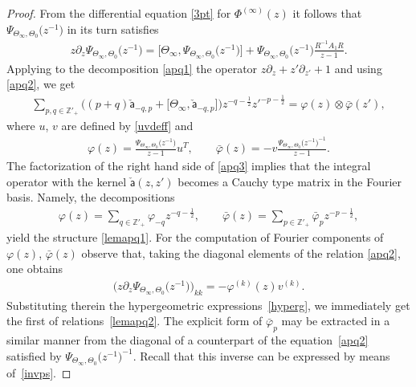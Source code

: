 \documentclass[pdftex]{sigma}
\numberwithin{equation}{section}
\begin{document}
\begin{proof}
From the differential equation \eqref{3pt} for $\Phi^{(\infty)}(z)$ it follows that $\Psi_{\Theta_{\infty},\Theta_{0}}\big(z^{-1}\big)$ in its turn satisfies
\begin{gather}\label{apq2}
z\partial_z \Psi_{\Theta_{\infty},\Theta_{0}}\big(z^{-1}\big)=\big[\Theta_{\infty},\Psi_{\Theta_{\infty},\Theta_{0}}\big(z^{-1}\big)\big]+\Psi_{\Theta_{\infty},\Theta_{0}}\big(z^{-1}\big) \frac{R^{-1} A_1 R}{z-1}.
\end{gather}
Applying to the decomposition \eqref{apq1} the operator $z\partial_z+z'\partial_{z'}+1$ and using \eqref{apq2}, we get
\begin{gather}\label{apq3}
\sum_{p,q\in\mathbb Z'_+}\big((p+q)\check{\mathsf a}_{-q,p}+\big[\Theta_\infty,\check{\mathsf a}_{-q,p}\big]\big) z^{-q-\frac12}z'^{-p-\frac12}=\varphi(z)\otimes \bar\varphi(z'),
\end{gather}
where $u$, $v$ are defined by \eqref{uvdeff} and
\begin{gather*}
\varphi(z)=\frac{\Psi_{\Theta_{\infty},\Theta_{0}}\big(z^{-1}\big)}{z-1} u^T,\qquad \bar\varphi(z)=-v \frac{\Psi_{\Theta_{\infty},\Theta_{0}}\big(z^{-1}\big)^{-1}}{z-1}.
\end{gather*}
The factorization of the right hand side of \eqref{apq3} implies that the integral operator with the kernel $\check{\mathsf a}(z,z')$ becomes a Cauchy type matrix in the Fourier basis. Namely, the decompositions
\begin{gather*}
\varphi(z)=\sum_{q\in\mathbb Z'_+}\varphi_{-q} z^{-q-\frac12}, \qquad \bar\varphi(z)=\sum_{p\in\mathbb Z'_+}\bar\varphi_{p} z^{-p-\frac12},
\end{gather*}
yield the structure \eqref{lemapq1}. For the computation of Fourier components of $\varphi(z)$, $\bar\varphi(z)$ observe that, taking the diagonal elements of the relation \eqref{apq2}, one obtains
\begin{gather*}
\big( z\partial_z \Psi_{\Theta_{\infty},\Theta_{0}}\big(z^{-1}\big)\big)_{kk}=-\varphi^{(k)}(z) v^{(k)}.
\end{gather*}
Substituting therein the hypergeometric expressions~\eqref{hyperg}, we immediately get the first of relations~\eqref{lemapq2}. The explicit form of $\bar\varphi_p$ may be extracted in a similar manner from the diagonal of a counterpart of the equation~\eqref{apq2} satisfied by $\Psi_{\Theta_{\infty},\Theta_{0}}\big(z^{-1}\big)^{-1}$. Recall that this inverse can be expressed by means of~\eqref{invps}.
\end{proof}
\end{document}
